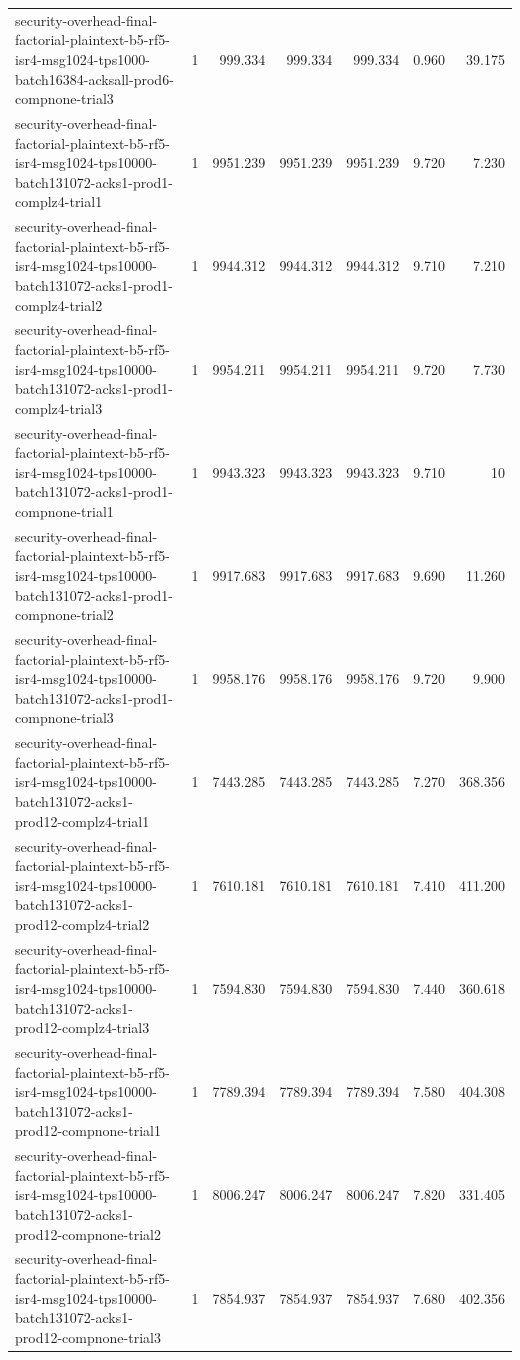 \begin{tabular}{lrrrrrr}
security-overhead-final-factorial-plaintext-b5-rf5-isr4-msg1024-tps1000-batch16384-acksall-prod6-compnone-trial3 & 1 & 999.334 & 999.334 & 999.334 & 0.960 & 39.175 \\
security-overhead-final-factorial-plaintext-b5-rf5-isr4-msg1024-tps10000-batch131072-acks1-prod1-complz4-trial1 & 1 & 9951.239 & 9951.239 & 9951.239 & 9.720 & 7.230 \\
security-overhead-final-factorial-plaintext-b5-rf5-isr4-msg1024-tps10000-batch131072-acks1-prod1-complz4-trial2 & 1 & 9944.312 & 9944.312 & 9944.312 & 9.710 & 7.210 \\
security-overhead-final-factorial-plaintext-b5-rf5-isr4-msg1024-tps10000-batch131072-acks1-prod1-complz4-trial3 & 1 & 9954.211 & 9954.211 & 9954.211 & 9.720 & 7.730 \\
security-overhead-final-factorial-plaintext-b5-rf5-isr4-msg1024-tps10000-batch131072-acks1-prod1-compnone-trial1 & 1 & 9943.323 & 9943.323 & 9943.323 & 9.710 & 10 \\
security-overhead-final-factorial-plaintext-b5-rf5-isr4-msg1024-tps10000-batch131072-acks1-prod1-compnone-trial2 & 1 & 9917.683 & 9917.683 & 9917.683 & 9.690 & 11.260 \\
security-overhead-final-factorial-plaintext-b5-rf5-isr4-msg1024-tps10000-batch131072-acks1-prod1-compnone-trial3 & 1 & 9958.176 & 9958.176 & 9958.176 & 9.720 & 9.900 \\
security-overhead-final-factorial-plaintext-b5-rf5-isr4-msg1024-tps10000-batch131072-acks1-prod12-complz4-trial1 & 1 & 7443.285 & 7443.285 & 7443.285 & 7.270 & 368.356 \\
security-overhead-final-factorial-plaintext-b5-rf5-isr4-msg1024-tps10000-batch131072-acks1-prod12-complz4-trial2 & 1 & 7610.181 & 7610.181 & 7610.181 & 7.410 & 411.200 \\
security-overhead-final-factorial-plaintext-b5-rf5-isr4-msg1024-tps10000-batch131072-acks1-prod12-complz4-trial3 & 1 & 7594.830 & 7594.830 & 7594.830 & 7.440 & 360.618 \\
security-overhead-final-factorial-plaintext-b5-rf5-isr4-msg1024-tps10000-batch131072-acks1-prod12-compnone-trial1 & 1 & 7789.394 & 7789.394 & 7789.394 & 7.580 & 404.308 \\
security-overhead-final-factorial-plaintext-b5-rf5-isr4-msg1024-tps10000-batch131072-acks1-prod12-compnone-trial2 & 1 & 8006.247 & 8006.247 & 8006.247 & 7.820 & 331.405 \\
security-overhead-final-factorial-plaintext-b5-rf5-isr4-msg1024-tps10000-batch131072-acks1-prod12-compnone-trial3 & 1 & 7854.937 & 7854.937 & 7854.937 & 7.680 & 402.356 \\

\end{tabular}
